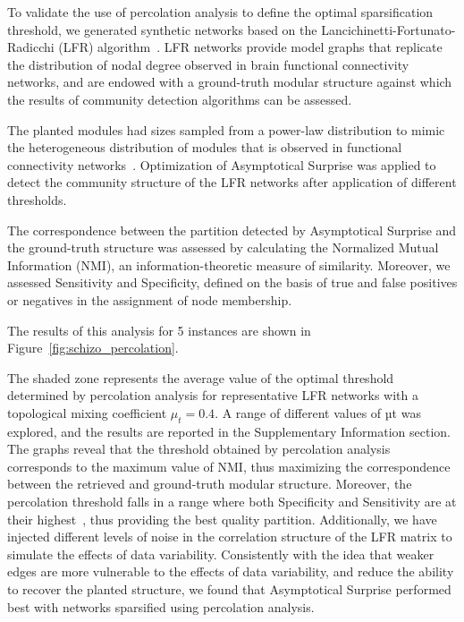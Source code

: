 To validate the use of percolation analysis to define the optimal sparsification threshold, we generated synthetic networks based on the Lancichinetti-Fortunato-Radicchi (LFR) algorithm~\cite{lancichinetti2008}.
LFR networks provide model graphs that replicate the distribution of nodal degree observed in brain functional connectivity networks, and are endowed with a ground-truth modular structure against which the results of community detection algorithms can be assessed.

The planted modules had sizes sampled from a power-law distribution to mimic the heterogeneous distribution of modules that is observed in functional connectivity networks~\cite{power2011,meunier2010}.
Optimization of Asymptotical Surprise was applied to detect the community structure of the LFR networks after application of different thresholds.

The correspondence between the partition detected by Asymptotical Surprise and the ground-truth structure was assessed by calculating the Normalized Mutual Information (NMI), an information-theoretic measure of similarity.
Moreover, we assessed Sensitivity and Specificity, defined on the basis of true and false positives or negatives in the assignment of node membership.

The results of this analysis for 5 instances are shown in Figure~\ref{fig:schizo_percolation}.

The shaded zone represents the average value of the optimal threshold determined by percolation analysis for representative LFR networks with a topological mixing coefficient $\mu_t=0.4$.
A range of different values of µt was explored, and the results are reported in the Supplementary Information section.
The graphs reveal that the threshold obtained by percolation analysis corresponds to the maximum value of NMI, thus maximizing the correspondence between the retrieved and ground-truth modular structure.
Moreover, the percolation threshold falls in a range where both Specificity and Sensitivity are at their highest~\cite{zahoranszky-kohalmi2016a}, thus providing the best quality partition.
Additionally, we have injected different levels of noise in the correlation structure of the LFR matrix to simulate the effects of data variability.
Consistently with the idea that weaker edges are more vulnerable to the effects of data variability, and reduce the ability to recover the planted structure, we found that Asymptotical Surprise performed best with networks sparsified using percolation analysis.

